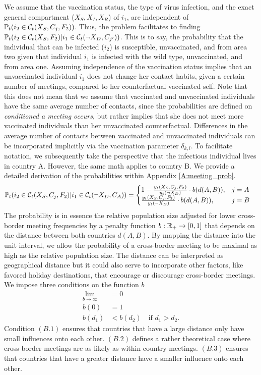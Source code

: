 We assume that the vaccination status, the type of virus infection, and the exact general compartment ($X_S, X_I, X_R$) of $i_1$, are independent of $\mathbb{P}_t(i_2 \in \mathcal{C}_t(X_S, C_j, F_2)) $. Thus, the problem facilitates to finding $\mathbb{P}_t(i_2 \in \mathcal{C}_t(X_S, F_2) | i_1 \in \mathcal{C}_t(\neg X_D, C_{j'}))$. This is to say, the probability that the individual that can be infected ($i_2$) is susceptible, unvaccinated, and from area two given that individual $i_1$ is infected with the wild type, unvaccinated, and from area one. Assuming independence of the vaccination status implies that an unvaccinated individual $i_1$ does not change her contact habits, given a certain number of meetings, compared to her counterfactual vaccinated self. Note that this does not mean that we assume that vaccinated and unvaccinated individuals have the same average number of contacts, since the probabilities are defined on \textit{conditioned a meeting occurs}, but rather implies that she does not meet more vaccinated individuals than her unvaccinated counterfactual. Differences in the average number of contacts between vaccinated and unvaccinated individuals can be incorporated implicitly via the vaccination parameter $\delta_{k,l}$. To facilitate notation, we subsequently take the perspective that the infectious individual lives in country A. However, the same math applies to country B. We provide a detailed derivation of the probabilities within Appendix \ref{A:meeting_prob}.
\begin{align}
\label{eq:cond_meeting_prob}
\mathbb{P}_t(i_2 \in \mathcal{C}_t(X_S, C_j, F_2)|i_1 \in \mathcal{C}_t(\neg X_D, C_A)) &= \begin{cases} 
      1-\frac{y_t(X_S, C_j, F_2)}{y_t(\neg X_D)} \cdot b(d(A, B)), & j = A \\
      \frac{y_t(X_S, C_j, F_2)}{y_t(\neg X_D)} \cdot b(d(A, B)), & j = B 
   \end{cases}
\end{align}
The probability is in essence the relative population size adjusted for lower cross-border meeting frequencies by a penalty function $b: \mathbb{R}_+ \to [0,1]$ that depends on the distance between both countries $d(A, B)$. By mapping the distance into the unit interval, we allow the probability of a cross-border meeting to be maximal as high as the relative population size. The distance can be interpreted as geographical distance but it could also serve to incorporate other factors, like favored holiday destinations, that encourage or discourage cross-border meetings. We impose three conditions on the function $b$
\begin{align}
\lim_{b \to \infty} &= 0 \tag{B.1}\\
b(0) &= 1 \tag{B.2}\\
b(d_1) &< b(d_2) \quad \textrm{if } d_1 > d_2. \tag{B.3}
\end{align}
Condition $(B.1)$ ensures that countries that have a large distance only have small influences onto each other. $(B.2)$ defines a rather theoretical case where cross-border meetings are as likely as within-country meetings. $(B.3)$ ensures that countries that have a greater distance have a smaller influence onto each other. \\


